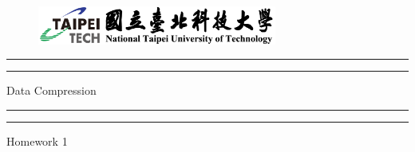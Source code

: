 \documentclass[a4paper, 11pt, oneside]{article} %
\begin{document}
 

\begin{titlepage} %

	\centering %
	
	\scshape %
	
    \vspace*{\baselineskip} %
    
    \begin{figure}

        \centering

        \includegraphics[width=0.7\textwidth]{image/logo}

    \end{figure}
	
	
	\rule{\textwidth}{1.6pt}\vspace*{-\baselineskip}\vspace*{2pt} %
	\rule{\textwidth}{0.4pt} %
	
	\vspace{0.75\baselineskip} %
	
	{\LARGE Data Compression} %
	
	\vspace{0.75\baselineskip} %
	
	\rule{\textwidth}{0.4pt}\vspace*{-\baselineskip}\vspace{3.2pt} %
	\rule{\textwidth}{1.6pt} %
	
	\vspace{2\baselineskip} %
	
	
	Homework 1 %
	
	\vspace*{3\baselineskip} %
	

\end{titlepage}
\end{document}
